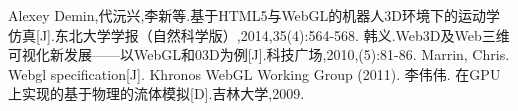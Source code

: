 \begin{thebibliography}{35}

 Alexey Demin,代沅兴,李新等.基于HTML5与WebGL的机器人3D环境下的运动学仿真[J].东北大学学报（自然科学版）,2014,35(4):564-568.
 韩义.Web3D及Web三维可视化新发展——以WebGL和03D为例[J].科技广场,2010,(5):81-86.
 Marrin, Chris. Webgl specification[J]. Khronos WebGL Working Group (2011).
 李伟伟. 在GPU上实现的基于物理的流体模拟[D].吉林大学,2009.

\end{thebibliography}
